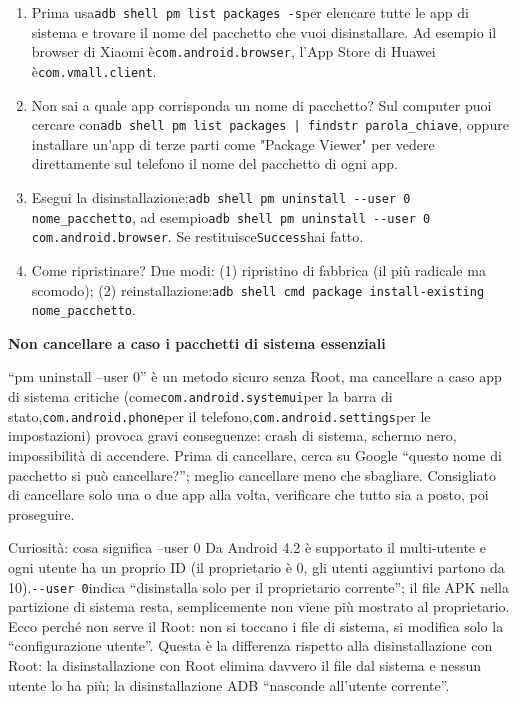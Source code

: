 \begin{enumerate}
  \item Prima usa\texttt{adb shell pm list packages -\allowbreak s}per elencare tutte le app di sistema e trovare il nome del pacchetto che vuoi disinstallare. Ad esempio il browser di Xiaomi è\texttt{com.\allowbreak android.\allowbreak browser}, l'App Store di Huawei è\texttt{com.\allowbreak vmall.\allowbreak client}.
  \item Non sai a quale app corrisponda un nome di pacchetto? Sul computer puoi cercare con\texttt{adb shell pm list packages | findstr parola\_chiave}, oppure installare un'app di terze parti come "Package Viewer" per vedere direttamente sul telefono il nome del pacchetto di ogni app.
  \item Esegui la disinstallazione:\texttt{adb shell pm uninstall -\allowbreak -\allowbreak user 0 nome\_pacchetto}, ad esempio\texttt{adb shell pm uninstall -\allowbreak -\allowbreak user 0 com.\allowbreak android.\allowbreak browser}. Se restituisce\texttt{Success}hai fatto.
  \item Come ripristinare? Due modi: (1) ripristino di fabbrica (il più radicale ma scomodo); (2) reinstallazione:\texttt{adb shell cmd package install-\allowbreak existing nome\_pacchetto}.
\end{enumerate}

\textbf{Non cancellare a caso i pacchetti di sistema essenziali}\par

“pm uninstall --user 0” è un metodo sicuro senza Root, ma cancellare a caso app di sistema critiche (come\texttt{com.\allowbreak android.\allowbreak systemui}per la barra di stato,\texttt{com.\allowbreak android.\allowbreak phone}per il telefono,\texttt{com.\allowbreak android.\allowbreak settings}per le impostazioni) provoca gravi conseguenze: crash di sistema, schermo nero, impossibilità di accendere. Prima di cancellare, cerca su Google “questo nome di pacchetto si può cancellare?”; meglio cancellare meno che sbagliare. Consigliato di cancellare solo una o due app alla volta, verificare che tutto sia a posto, poi proseguire.

\begin{tcbinfo}{Curiosità: cosa significa --user 0}
Da Android 4.2 è supportato il multi-utente e ogni utente ha un proprio ID (il proprietario è 0, gli utenti aggiuntivi partono da 10).\texttt{-\allowbreak -\allowbreak user 0}indica “disinstalla solo per il proprietario corrente”; il file APK nella partizione di sistema resta, semplicemente non viene più mostrato al proprietario. Ecco perché non serve il Root: non si toccano i file di sistema, si modifica solo la “configurazione utente”. Questa è la differenza rispetto alla disinstallazione con Root: la disinstallazione con Root elimina davvero il file dal sistema e nessun utente lo ha più; la disinstallazione ADB “nasconde all'utente corrente”.

\end{tcbinfo}


